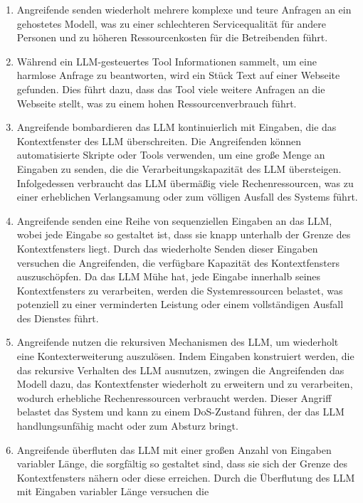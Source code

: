 \documentclass[
]{article}
\providecommand{\tightlist}{%
  \setlength{\itemsep}{0pt}\setlength{\parskip}{0pt}}
\begin{document}
\begin{enumerate}
\def\labelenumi{\arabic{enumi}.}
\tightlist
\item
  Angreifende senden wiederholt mehrere komplexe und teure Anfragen an
  ein gehostetes Modell, was zu einer schlechteren Servicequalität für
  andere Personen und zu höheren Ressourcenkosten für die Betreibenden
  führt.
\item
  Während ein LLM-gesteuertes Tool Informationen sammelt, um eine
  harmlose Anfrage zu beantworten, wird ein Stück Text auf einer
  Webseite gefunden. Dies führt dazu, dass das Tool viele weitere
  Anfragen an die Webseite stellt, was zu einem hohen
  Ressourcenverbrauch führt.
\item
  Angreifende bombardieren das LLM kontinuierlich mit Eingaben, die das
  Kontextfenster des LLM überschreiten. Die Angreifenden können
  automatisierte Skripte oder Tools verwenden, um eine große Menge an
  Eingaben zu senden, die die Verarbeitungskapazität des LLM
  übersteigen. Infolgedessen verbraucht das LLM übermäßig viele
  Rechenressourcen, was zu einer erheblichen Verlangsamung oder zum
  völligen Ausfall des Systems führt.
\item
  Angreifende senden eine Reihe von sequenziellen Eingaben an das LLM,
  wobei jede Eingabe so gestaltet ist, dass sie knapp unterhalb der
  Grenze des Kontextfensters liegt. Durch das wiederholte Senden dieser
  Eingaben versuchen die Angreifenden, die verfügbare Kapazität des
  Kontextfensters auszuschöpfen. Da das LLM Mühe hat, jede Eingabe
  innerhalb seines Kontextfensters zu verarbeiten, werden die
  Systemressourcen belastet, was potenziell zu einer verminderten
  Leistung oder einem vollständigen Ausfall des Dienstes führt.
\item
  Angreifende nutzen die rekursiven Mechanismen des LLM, um wiederholt
  eine Kontexterweiterung auszulösen. Indem Eingaben konstruiert werden,
  die das rekursive Verhalten des LLM ausnutzen, zwingen die
  Angreifenden das Modell dazu, das Kontextfenster wiederholt zu
  erweitern und zu verarbeiten, wodurch erhebliche Rechenressourcen
  verbraucht werden. Dieser Angriff belastet das System und kann zu
  einem DoS-Zustand führen, der das LLM handlungsunfähig macht oder zum
  Absturz bringt.
\item
  Angreifende überfluten das LLM mit einer großen Anzahl von Eingaben
  variabler Länge, die sorgfältig so gestaltet sind, dass sie sich der
  Grenze des Kontextfensters nähern oder diese erreichen. Durch die
  Überflutung des LLM mit Eingaben variabler Länge versuchen die

\end{enumerate}
\end{document}

